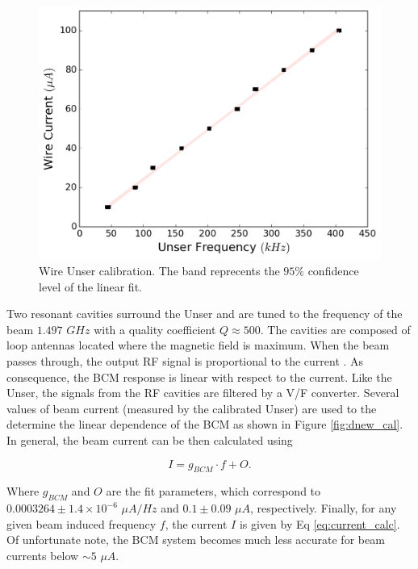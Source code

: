 \documentclass[final,5p,times,twocolumn]{elsarticle}
\begin{document}
\begin{figure}[!h]
    \centering
    \includegraphics[width=\linewidth]{unser_calibration.pdf}
    \caption{Wire Unser calibration. The band reprecents the $95\%$ confidence level of the linear fit.}
    \label{fig:unser_cal}
\end{figure}
  
Two resonant cavities surround the Unser and are tuned to the frequency of the beam $1.497$ $GHz$ with a quality coefficient $Q \approx 500$. The cavities are composed of loop antennas located where the magnetic field is maximum. When the beam passes through, the output RF signal is proportional to the current \cite{denard}. As consequence, the BCM response is linear with respect to the current. Like the Unser, the signals from the RF cavities are filtered by a V/F converter. Several values of beam current (measured by the calibrated Unser) are used to the determine the linear dependence of the BCM as shown in Figure \ref{fig:dnew_cal}. In general, the beam current can be then calculated using

\begin{equation}
I = g_{BCM}\cdot f+O.
\label{eq:current_calc}
\end{equation}

\noindent Where $g_{BCM}$ and $O$ are the fit parameters, which correspond to $0.0003264 \pm 1.4 \times 10^{-6}$ $\mu A/Hz$ and $0.1 \pm 0.09$  $\mu A$, respectively. Finally, for any given beam induced frequency $f$, the current $I$ is given by Eq \ref{eq:current_calc}. Of unfortunate note, the BCM system becomes much less accurate for beam currents below $\sim 5$ $\mu A$.
  
\end{document}
